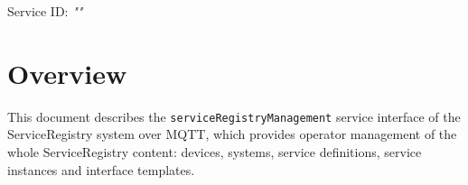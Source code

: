 \documentclass[a4paper]{arrowhead}
\begin{document}
\sloppy

\ArrowheadSetup

\begin{center}
  \vspace*{1cm}
  \huge{\arrowtitle}

  \vspace*{0.2cm}
  \LARGE{\arrowtype}
  \vspace*{1cm}

  \Large{Service ID: \textit{"\arrowid"}}

  \vspace*{\fill}


  \vspace*{1cm}
  \vspace*{\fill}

  \begin{abstract}
    This document describes the MQTT protocol with TLS payload security and JSON payload encoding variant of the \texttt{service\allowbreak{}Registry\allowbreak{}Management} service of the ServiceRegistry system.
  \end{abstract}

  \vspace*{1cm}
\end{center}

\newpage

\tableofcontents
\newpage

\section{Overview}
\label{sec:overview}

This document describes the \texttt{service\allowbreak{}Registry\allowbreak{}Management} service interface of the ServiceRegistry system over MQTT, which provides operator management of the whole ServiceRegistry content: devices, systems, service definitions, service instances and interface templates.
\end{document}
